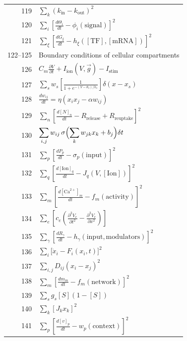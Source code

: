 \documentclass[11pt,a4paper]{article}
\begin{document}
\begin{longtable}{r p{}}
	119 & \(\displaystyle \sum_k(k_{\text{in}} - k_{\text{out}})^2\) \\
	120 & \(\displaystyle \sum_i\left[\frac{d\Theta_i}{dt} - \phi_i(\text{signal})\right]^2\) \\
	121 & \(\displaystyle \sum_\xi\left[\frac{dG_\xi}{dt} - h_\xi([\text{TF}],[\text{mRNA}])\right]^2\) \\
	122–125 & Boundary conditions of cellular compartments \\
	126 & \(\displaystyle C_m\frac{\partial V}{\partial t} + I_{\text{ion}}(V,\vec g) - I_{\text{stim}}\) \\
	127 & \(\displaystyle \sum_s w_s\left[\frac{1}{1+e^{-(V-\theta_s)/k_s}}\right]\delta(x-x_s)\) \\
	128 & \(\displaystyle \frac{dw_{ij}}{dt} = \eta(x_i x_j - \alpha w_{ij})\) \\
	129 & \(\displaystyle \sum_n\left[\frac{d[N]_n}{dt} - R_{\text{release}} + R_{\text{reuptake}}\right]^2\) \\
	130 & \(\displaystyle \sum_{i,j} w_{ij}\,\sigma\Bigl(\sum_k w_{jk}x_k + b_j\Bigr)\delta t\) \\
	131 & \(\displaystyle \sum_p\left[\frac{dP_p}{dt} - \sigma_p(\text{input})\right]^2\) \\
	132 & \(\displaystyle \sum_q\left[\frac{d[\text{Ion}]_q}{dt} - J_q(V,[\text{Ion}])\right]^2\) \\
	133 & \(\displaystyle \sum_m\left[\frac{d[\text{Ca}^{2+}]_m}{dt} - f_m(\text{activity})\right]^2\) \\
	134 & \(\displaystyle \sum_e\left[c_e\left(\frac{\partial^2 V_e}{\partial t^2} - \frac{\partial^2 V_e}{\partial x^2}\right)\right]\) \\
	135 & \(\displaystyle \sum_\gamma\left[\frac{dR_\gamma}{dt} - h_\gamma(\text{input},\text{modulators})\right]^2\) \\
	136 & \(\displaystyle \sum_i\bigl[\dot x_i - F_i(x_i,t)\bigr]^2\) \\
	137 & \(\displaystyle \sum_{i,j} D_{ij}(x_i - x_j)^2\) \\
	138 & \(\displaystyle \sum_m\left[\frac{dm_m}{dt} - f_m(\text{network})\right]^2\) \\
	139 & \(\displaystyle \sum_s g_s[S](1-[S])\) \\
	140 & \(\displaystyle \sum_k [J_k x_k]^2\) \\
	141 & \(\displaystyle \sum_p\left[\frac{d[v]_p}{dt} - w_p(\text{context})\right]^2\) \\

\end{longtable}
\end{document}
